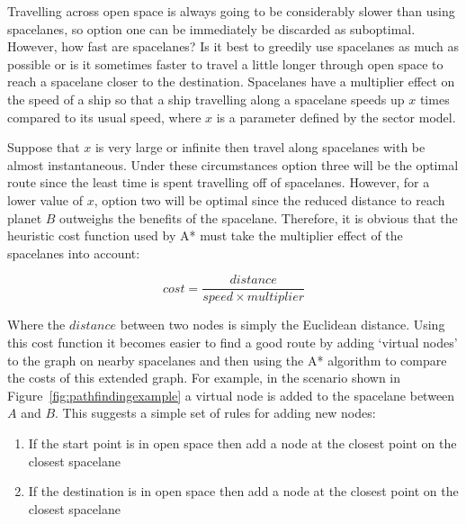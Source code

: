 Travelling across open space is always going to be considerably slower than using spacelanes, so option one can be immediately be discarded as suboptimal. However, how fast are spacelanes? Is it best to greedily use spacelanes as much as possible or is it sometimes faster to travel a little longer through open space to reach a spacelane closer to the destination. Spacelanes have a multiplier effect on the speed of a ship so that a ship travelling along a spacelane speeds up $x$ times compared to its usual speed, where $x$ is a parameter defined by the sector model.

Suppose that $x$ is very large or infinite then travel along spacelanes with be almost instantaneous. Under these circumstances option three will be the optimal route since the least time is spent travelling off of spacelanes. However, for a lower value of $x$, option two will be optimal since the reduced distance to reach planet $B$ outweighs the benefits of the spacelane. Therefore, it is obvious that the heuristic cost function used by A* must take the multiplier effect of the spacelanes into account:

\begin{equation*}
	cost = \frac{distance}{speed \times multiplier}
\end{equation*}

Where the $distance$ between two nodes is simply the Euclidean distance. Using this cost function it becomes easier to find a good route by adding `virtual nodes' to the graph on nearby spacelanes and then using the A* algorithm to compare the costs of this extended graph. For example, in the scenario shown in Figure~\ref{fig:pathfindingexample} a virtual node is added to the spacelane between $A$ and $B$. This suggests a simple set of rules for adding new nodes:

\begin{enumerate}
	\item If the start point is in open space then add a node at the closest point on the closest spacelane
	\item If the destination is in open space then add a node at the closest point on the closest spacelane
\end{enumerate}

